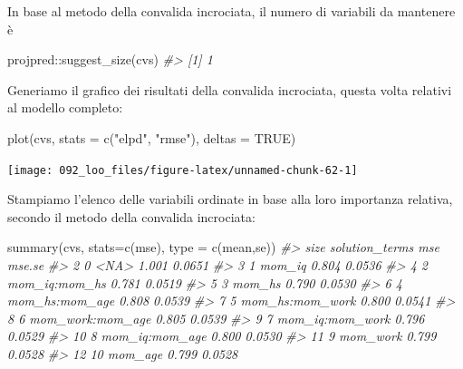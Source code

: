 \documentclass[
  10pt,
  italian,
  a4paper,
  extrafontsizes,onecolumn,openright
  ]{memoir}
\newenvironment{Shaded}{\begin{snugshade}}{\end{snugshade}}
\newcommand{\AttributeTok}[1]{\textcolor[rgb]{0.77,0.63,0.00}{#1}}
\newcommand{\CommentTok}[1]{\textcolor[rgb]{0.56,0.35,0.01}{\textit{#1}}}
\newcommand{\ConstantTok}[1]{\textcolor[rgb]{0.00,0.00,0.00}{#1}}
\newcommand{\FunctionTok}[1]{\textcolor[rgb]{0.00,0.00,0.00}{#1}}
\newcommand{\NormalTok}[1]{#1}
\newcommand{\SpecialCharTok}[1]{\textcolor[rgb]{0.00,0.00,0.00}{#1}}
\newcommand{\StringTok}[1]{\textcolor[rgb]{0.31,0.60,0.02}{#1}}
\theoremstyle{definition}
\theoremstyle{definition}
\theoremstyle{definition}
\theoremstyle{definition}
\theoremstyle{remark}
\begin{document}
\noindent
In base al metodo della convalida incrociata, il numero di variabili da mantenere è

\begin{Shaded}
\begin{Highlighting}[]
\NormalTok{projpred}\SpecialCharTok{::}\FunctionTok{suggest\_size}\NormalTok{(cvs)}
\CommentTok{\#\textgreater{} [1] 1}
\end{Highlighting}
\end{Shaded}

\noindent
Generiamo il grafico dei risultati della convalida incrociata, questa volta relativi al modello completo:

\begin{Shaded}
\begin{Highlighting}[]
\FunctionTok{plot}\NormalTok{(cvs, }\AttributeTok{stats =} \FunctionTok{c}\NormalTok{(}\StringTok{"elpd"}\NormalTok{, }\StringTok{"rmse"}\NormalTok{), }\AttributeTok{deltas =} \ConstantTok{TRUE}\NormalTok{)}
\end{Highlighting}
\end{Shaded}

\begin{center}\texttt{[image: 092\_loo\_files/figure-latex/unnamed-chunk-62-1]} \end{center}

\noindent
Stampiamo l'elenco delle variabili ordinate in base alla loro importanza relativa, secondo il metodo della convalida incrociata:

\begin{Shaded}
\begin{Highlighting}[]
\FunctionTok{summary}\NormalTok{(cvs, }\AttributeTok{stats=}\FunctionTok{c}\NormalTok{(}\StringTok{\textquotesingle{}mse\textquotesingle{}}\NormalTok{), }\AttributeTok{type =} \FunctionTok{c}\NormalTok{(}\StringTok{\textquotesingle{}mean\textquotesingle{}}\NormalTok{,}\StringTok{\textquotesingle{}se\textquotesingle{}}\NormalTok{))}
\CommentTok{\#\textgreater{}    size   solution\_terms   mse mse.se}
\CommentTok{\#\textgreater{} 2     0             \textless{}NA\textgreater{} 1.001 0.0651}
\CommentTok{\#\textgreater{} 3     1           mom\_iq 0.804 0.0536}
\CommentTok{\#\textgreater{} 4     2    mom\_iq:mom\_hs 0.781 0.0519}
\CommentTok{\#\textgreater{} 5     3           mom\_hs 0.790 0.0530}
\CommentTok{\#\textgreater{} 6     4   mom\_hs:mom\_age 0.808 0.0539}
\CommentTok{\#\textgreater{} 7     5  mom\_hs:mom\_work 0.800 0.0541}
\CommentTok{\#\textgreater{} 8     6 mom\_work:mom\_age 0.805 0.0539}
\CommentTok{\#\textgreater{} 9     7  mom\_iq:mom\_work 0.796 0.0529}
\CommentTok{\#\textgreater{} 10    8   mom\_iq:mom\_age 0.800 0.0530}
\CommentTok{\#\textgreater{} 11    9         mom\_work 0.799 0.0528}
\CommentTok{\#\textgreater{} 12   10          mom\_age 0.799 0.0528}
\end{Highlighting}
\end{Shaded}
\end{document}

